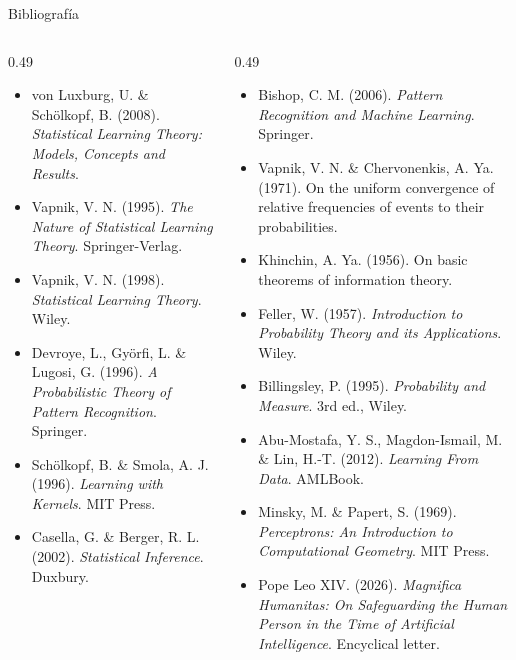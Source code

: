 \documentclass[aspectratio=169, 10pt]{beamer}
\begin{document}
\begin{frame}{Bibliografía}
  \tiny
  \begin{columns}[T]
    \begin{column}{0.49\textwidth}
      \begin{itemize}
        \setlength{\itemsep}{0.25em}
        \item von Luxburg, U. \& Schölkopf, B. (2008). \textit{Statistical Learning Theory: Models, Concepts and Results}.
        \item Vapnik, V. N. (1995). \textit{The Nature of Statistical Learning Theory}. Springer-Verlag.
        \item Vapnik, V. N. (1998). \textit{Statistical Learning Theory}. Wiley.
        \item Devroye, L., Györfi, L. \& Lugosi, G. (1996). \textit{A Probabilistic Theory of Pattern Recognition}. Springer.
        \item Schölkopf, B. \& Smola, A. J. (1996). \textit{Learning with Kernels}. MIT Press.
        \item Casella, G. \& Berger, R. L. (2002). \textit{Statistical Inference}. Duxbury.
      \end{itemize}
    \end{column}
    \begin{column}{0.49\textwidth}
      \begin{itemize}
        \setlength{\itemsep}{0.25em}
        \item Bishop, C. M. (2006). \textit{Pattern Recognition and Machine Learning}. Springer.
        \item Vapnik, V. N. \& Chervonenkis, A. Ya. (1971). On the uniform convergence of relative frequencies of events to their probabilities.
        \item Khinchin, A. Ya. (1956). On basic theorems of information theory.
        \item Feller, W. (1957). \textit{Introduction to Probability Theory and its Applications}. Wiley.
        \item Billingsley, P. (1995). \textit{Probability and Measure}. 3rd ed., Wiley.
        \item Abu-Mostafa, Y. S., Magdon-Ismail, M. \& Lin, H.-T. (2012). \textit{Learning From Data}. AMLBook.
        \item Minsky, M. \& Papert, S. (1969). \textit{Perceptrons: An Introduction to Computational Geometry}. MIT Press.
        \item Pope Leo XIV. (2026). \textit{Magnifica Humanitas: On Safeguarding the Human Person in the Time of Artificial Intelligence}. Encyclical letter.
      \end{itemize}
    \end{column}
  \end{columns}
\end{frame}
\end{document}
